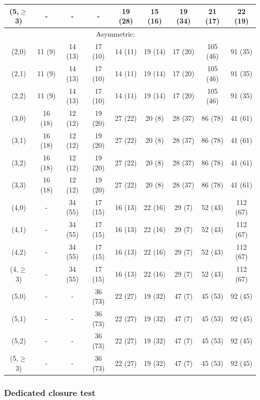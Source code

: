 \begin{table}[h!]
\begin{tabular}{ ccccccccc }
    (5,$\geq$3) & -       & -       & -       & 19 (28) & 15 (16) & 19 (34) & 21 (17)  & 22 (19)   \\
    \hline
    \multicolumn{8}{c}{Asymmetric:}                                                                \\
    (2,0)       & 11 (9)  & 14 (13) & 17 (10) & 14 (11) & 19 (14) & 17 (20) & 105 (46) & 91   (35) \\
    (2,1)       & 11 (9)  & 14 (13) & 17 (10) & 14 (11) & 19 (14) & 17 (20) & 105 (46) & 91   (35) \\
    (2,2)       & 11 (9)  & 14 (13) & 17 (10) & 14 (11) & 19 (14) & 17 (20) & 105 (46) & 91   (35) \\
    (3,0)       & 16 (18) & 12 (12) & 19 (20) & 27 (22) & 20 (8)  & 28 (37) & 86 (78)  & 41   (61) \\
    (3,1)       & 16 (18) & 12 (12) & 19 (20) & 27 (22) & 20 (8)  & 28 (37) & 86 (78)  & 41   (61) \\
    (3,2)       & 16 (18) & 12 (12) & 19 (20) & 27 (22) & 20 (8)  & 28 (37) & 86 (78)  & 41   (61) \\
    (3,3)       & 16 (18) & 12 (12) & 19 (20) & 27 (22) & 20 (8)  & 28 (37) & 86 (78)  & 41   (61) \\
    (4,0)       & -       & 34 (55) & 17 (15) & 16 (13) & 22 (16) & 29 (7)  & 52 (43)  & 112  (67) \\
    (4,1)       & -       & 34 (55) & 17 (15) & 16 (13) & 22 (16) & 29 (7)  & 52 (43)  & 112  (67) \\
    (4,2)       & -       & 34 (55) & 17 (15) & 16 (13) & 22 (16) & 29 (7)  & 52 (43)  & 112  (67) \\
    (4,$\geq$3) & -       & 34 (55) & 17 (15) & 16 (13) & 22 (16) & 29 (7)  & 52 (43)  & 112  (67) \\
    (5,0)       & -       & -       & 36 (73) & 22 (27) & 19 (32) & 47 (7)  & 45 (53)  & 92   (45) \\
    (5,1)       & -       & -       & 36 (73) & 22 (27) & 19 (32) & 47 (7)  & 45 (53)  & 92   (45) \\
    (5,2)       & -       & -       & 36 (73) & 22 (27) & 19 (32) & 47 (7)  & 45 (53)  & 92   (45) \\
    (5,$\geq$3) & -       & -       & 36 (73) & 22 (27) & 19 (32) & 47 (7)  & 45 (53)  & 92   (45) \\
    \hline
    \hline
  \end{tabular}
\end{table}

\subsubsection{Dedicated \alphat closure test}

